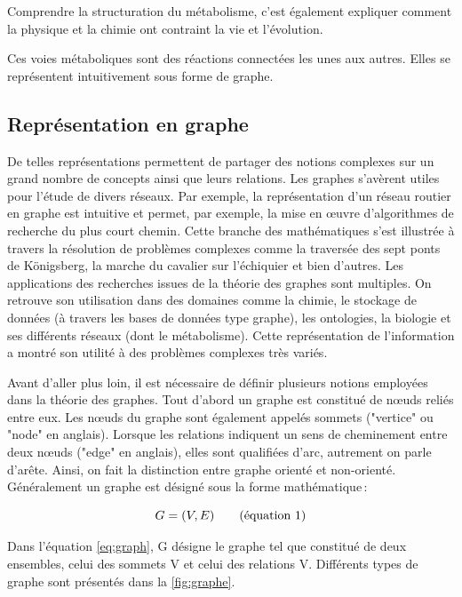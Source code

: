 \begin{refsegment}
    Comprendre la structuration du métabolisme, c'est également expliquer comment la physique et la chimie ont contraint la vie et l'évolution.
    
    Ces voies métaboliques sont des réactions connectées les unes aux autres. Elles se représentent intuitivement sous forme de graphe.
    
    \subsection{Représentation en graphe}
    
    De telles représentations permettent de partager des notions complexes sur un grand nombre de concepts ainsi que leurs relations. Les graphes s'avèrent utiles pour l'étude de divers réseaux. Par exemple, la représentation d’un réseau routier en graphe est intuitive et permet, par exemple, la mise en œuvre d'algorithmes de recherche du plus court chemin. Cette branche des mathématiques s'est illustrée à travers la résolution de problèmes complexes comme la traversée des sept ponts de Königsberg, la marche du cavalier sur l’échiquier et bien d'autres. Les applications des recherches issues de la théorie des graphes sont multiples. On retrouve son utilisation dans des domaines comme la chimie, le stockage de données (à travers les bases de données type graphe), les ontologies, la biologie et ses différents réseaux (dont le métabolisme). Cette représentation de l'information a montré son utilité à des problèmes complexes très variés.
    
    Avant d'aller plus loin, il est nécessaire de définir plusieurs notions employées dans la théorie des graphes. Tout d'abord un graphe est constitué de nœuds reliés entre eux. Les nœuds du graphe sont également appelés sommets ("vertice" ou "node" en anglais).  Lorsque les relations indiquent un sens de cheminement entre deux nœuds ("edge" en anglais), elles sont qualifiées d'arc, autrement on parle d'arête. Ainsi, on fait la distinction entre graphe orienté et non-orienté. Généralement un graphe est désigné sous la forme mathématique :
    
    \begin{equation}\label{eq:graph}
    	G = (V,E) \stepcounter{equation}\tag{équation \theequation}
    \end{equation}
    
    Dans l'équation \ref{eq:graph}, G désigne le graphe tel que constitué de deux ensembles, celui des sommets V et celui des relations V. Différents types de graphe sont présentés dans la \cref{fig:graphe}.
    

\end{refsegment}
